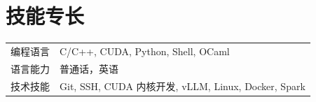 \documentclass[a4paper,12pt]{article}
\begin{document}

\section{技能专长}
\begin{tabularx}{\linewidth}{@{}l X@{}}
编程语言 &  \normalsize{C/C++, CUDA, Python, Shell, OCaml} \\
语言能力 &  \normalsize{普通话，英语} \\
技术技能 & \normalsize{Git, SSH, CUDA 内核开发, vLLM, Linux, Docker, Spark} \\
\end{tabularx}

\vfill
{}
\end{document}
